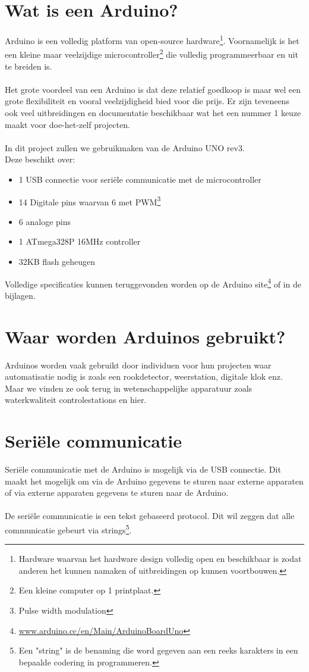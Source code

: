 \documentclass[10pt,twoside]{report}
\begin{document}
\section{Wat is een Arduino?}
Arduino is een volledig platform van open-source hardware\footnote{Hardware waarvan het hardware design volledig open en beschikbaar is zodat anderen het kunnen namaken of uitbreidingen op kunnen voortbouwen.}. Voornamelijk is het een kleine maar veelzijdige microcontroller\footnote{Een kleine computer op 1 printplaat.} die volledig programmeerbaar en uit te breiden is.
\\\\
Het grote voordeel van een Arduino is dat deze relatief goedkoop is maar wel een grote flexibiliteit en vooral veelzijdigheid bied voor die prijs. Er zijn teveneens ook veel uitbreidingen en documentatie beschikbaar wat het een nummer 1 keuze maakt voor doe-het-zelf projecten.
\\\\
In dit project zullen we gebruikmaken van de Arduino UNO rev3.\\
Deze beschikt over:
\begin{itemize}
    \item 1 USB connectie voor seriële communicatie met de microcontroller
    \item 14 Digitale pins waarvan 6 met PWM\footnote{Pulse width modulation}
    \item 6 analoge pins
    \item 1 ATmega328P 16MHz controller
    \item 32KB flash geheugen
\end{itemize}
Volledige specificaties kunnen teruggevonden worden op de Arduino site\footnote{\url{www.arduino.cc/en/Main/ArduinoBoardUno}} of in de bijlagen.
\section{Waar worden Arduinos gebruikt?}
Arduinos worden vaak gebruikt door individuen voor hun projecten waar automatisatie nodig is zoals een rookdetector, weerstation, digitale klok enz. Maar we vinden ze ook terug in wetenschappelijke apparatuur zoals waterkwaliteit controlestations en hier.
\section{Seriële communicatie}
Seriële communicatie met de Arduino is mogelijk via de USB connectie. Dit maakt het mogelijk om via de Arduino gegevens te sturen naar externe apparaten of via externe apparaten gegevens te sturen naar de Arduino.
\\\\
De seriële communicatie is een tekst gebaseerd protocol. Dit wil zeggen dat alle communicatie gebeurt via strings\footnote{Een "string" is de benaming die word gegeven aan een reeks karakters in een bepaalde codering in programmeren.}.\\
\end{document}

